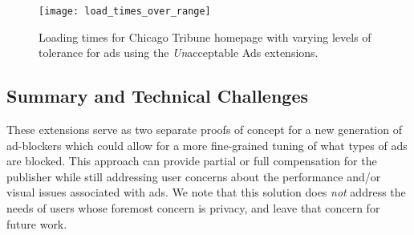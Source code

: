 \begin{figure}[h]
\centering
\texttt{[image: load\_times\_over\_range]}
\caption{Loading times for Chicago Tribune homepage with varying levels of tolerance for ads using the \textit{Un}acceptable Ads extensions.}
\label{fig:load_times_over_range}
\end{figure}

\subsection{Summary and Technical Challenges}
These extensions serve as two separate proofs of concept for a new generation of ad-blockers which could allow for a more fine-grained tuning of what types of ads are blocked.
This approach can provide partial or full compensation for the publisher while still addressing user concerns about the performance and/or visual issues associated with ads.
We note that this solution does \textit{not} address the needs of users whose foremost concern is privacy, and leave that concern for future work.

